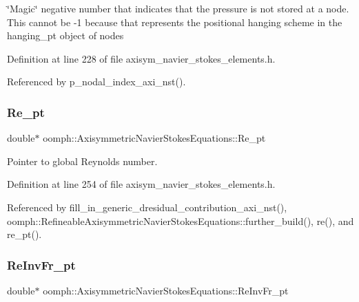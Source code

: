 \char`\"{}\+Magic\char`\"{} negative number that indicates that the pressure is not stored at a node. This cannot be -\/1 because that represents the positional hanging scheme in the hanging\+\_\+pt object of nodes 

Definition at line 228 of file axisym\+\_\+navier\+\_\+stokes\+\_\+elements.\+h.



Referenced by p\+\_\+nodal\+\_\+index\+\_\+axi\+\_\+nst().

\mbox{\label{classoomph_1_1AxisymmetricNavierStokesEquations_a623385a5197597302d8fcb21e201c50a}} 
\subsubsection{\texorpdfstring{Re\+\_\+pt}{Re\_pt}}
{\footnotesize\ttfamily double$\ast$ oomph\+::\+Axisymmetric\+Navier\+Stokes\+Equations\+::\+Re\+\_\+pt\hspace{0.3cm}{\ttfamily [protected]}}



Pointer to global Reynolds number. 



Definition at line 254 of file axisym\+\_\+navier\+\_\+stokes\+\_\+elements.\+h.



Referenced by fill\+\_\+in\+\_\+generic\+\_\+dresidual\+\_\+contribution\+\_\+axi\+\_\+nst(), oomph\+::\+Refineable\+Axisymmetric\+Navier\+Stokes\+Equations\+::further\+\_\+build(), re(), and re\+\_\+pt().

\mbox{\label{classoomph_1_1AxisymmetricNavierStokesEquations_a2eaed0ea722b1c5dda31d8aa411afe7b}} 
\subsubsection{\texorpdfstring{Re\+Inv\+Fr\+\_\+pt}{ReInvFr\_pt}}
{\footnotesize\ttfamily double$\ast$ oomph\+::\+Axisymmetric\+Navier\+Stokes\+Equations\+::\+Re\+Inv\+Fr\+\_\+pt\hspace{0.3cm}{\ttfamily [protected]}}




